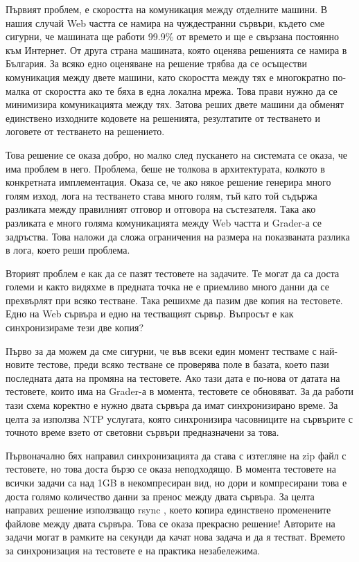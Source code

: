 \documentclass[a4paper,12pt]{article}
\begin{document}
  Първият проблем, е скоростта на комуникация между отделните машини. В нашия случай Web частта се намира на чуждестранни сървъри, където сме сигурни, че машината ще работи 99.9\% от времето и ще е свързана постоянно към Интернет. От друга страна машината, която оценява решенията се намира в България. За всяко едно оценяване на решение трябва да се осъществи комуникация между двете машини, като скоростта между тях е многократно по-малка от скоростта ако те бяха в една локална мрежа. Това прави нужно да се минимизира комуникацията между тях. Затова реших двете машини да обменят единствено изходните кодовете на решенията, резултатите от тестването и логовете от тестването на решението.
  
  Това решение се оказа добро, но малко след пускането на системата се оказа, че има проблем в него. Проблема, беше не толкова в архитектурата, колкото в конкретната имплементация. Оказа се, че ако някое решение генерира много голям изход, лога на тестването става много голям, тъй като той съдържа разликата между правилният отговор и отговора на състезателя. Така ако разликата е много голяма комуникацията между Web частта и Grader-а се задръства. Това наложи да сложа ограничения на размера на показваната разлика в лога, което реши проблема.
  
  Вторият проблем е как да се пазят тестовете на задачите. Те могат да са доста големи и както видяхме в предната точка не е приемливо много данни да се прехвърлят при всяко тестване. Така решихме да пазим две копия на тестовете. Едно на Web сървъра и едно на тестващият сървър. Въпросът е как синхронизираме тези две копия?
  
  Първо за да можем да сме сигурни, че във всеки един момент тестваме с най-новите тестове, преди всяко тестване се проверява поле в базата, което пази последната дата на промяна на тестовете. Ако тази дата е по-нова от датата на тестовете, които има на Grader-а в момента, тестовете се обновяват. За да работи тази схема коректно е нужно двата сървъра да имат синхронизирано време. За целта за използва NTP услугата, която синхронизира часовниците на сървърите с точното време взето от световни сървъри предназначени за това\cite{ntp}.
  
  Първоначално бях направил синхронизацията да става с изтегляне на zip файл с тестовете, но това доста бързо се оказа неподходящо. В момента тестовете на всички задачи са над 1GB в некомпресиран вид, но дори и компресирани това е доста голямо количество данни за пренос между двата сървъра. За целта направих решение използващо rsync \cite{rsync_site}, което копира единствено променените файлове между двата сървъра. Това се оказа прекрасно решение! Авторите на задачи могат в рамките на секунди да качат нова задача и да я тестват. Времето за синхронизация на тестовете е на практика незабележима.
  
\end{document}
